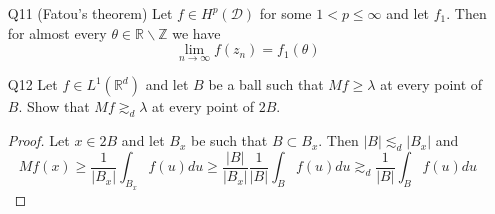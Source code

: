\documentclass[11pt]{article}
\theoremstyle{remark}
\newcommand{\1}{\textbf{1}}
\newcommand{\bbR}{\mathbb{R}}
\newcommand{\bbZ}{\mathbb{Z}}
\begin{document}
\begin{enumerate}
\begin{proof}
\[\]
as $h \to 0$ by the Lebesgue differentiation theorem.
\end{proof}
\item[Q11] (Fatou's theorem) Let $f \in H^p(\mathcal{D})$ for some $1 < p \leq \infty$ and let $f_1$. Then for almost every $\theta \in \bbR \backslash \bbZ$ we have
\[
\lim_{n \to \infty} f(z_n) = f_1(\theta)
\]
\item[Q12] Let $f \in L^1(\bbR^d)$ and let $B$ be a ball such that $Mf \geq \lambda$ at every point of $B$. Show that $Mf \gtrsim_d \lambda$ at every point of $2B$.
\begin{proof}
Let $x \in 2B$ and let $B_x$ be such that $B \subset B_x$. Then $|B| \lesssim_d |B_x|$ and
\[
Mf(x) \geq \frac{1}{|B_x|} \int_{B_x} f(u) du \geq \frac{|B|}{|B_x|} \frac{1}{|B|}\int_{B} f(u) du \gtrsim_d \frac{1}{|B|}\int_{B} f(u) du
\]
\end{proof}
\end{enumerate}
\end{document}
